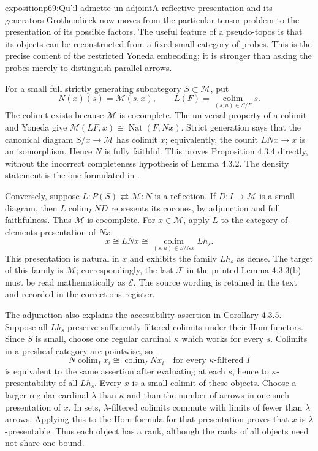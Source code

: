 \begin{dcomment}{exposition}{p69:Qu'il admette un adjoint}{A reflective presentation and its generators}
Grothendieck now moves from the particular tensor problem to the presentation of its possible factors.  The useful feature of a pseudo-topos is that its objects can be reconstructed from a fixed small category of probes.  This is the precise content of the restricted Yoneda embedding; it is stronger than asking the probes merely to distinguish parallel arrows.

For a small full strictly generating subcategory $S\subset\mathcal M$, put
\[
 N(x)(s)=\mathcal M(s,x),\qquad
 L(F)=\operatorname*{colim}_{(s,u)\in S/F}s.
\]
The colimit exists because $\mathcal M$ is cocomplete.  The universal property of a colimit and Yoneda give $\mathcal M(LF,x)\cong\operatorname{Nat}(F,Nx)$.  Strict generation says that the canonical diagram $S/x\to\mathcal M$ has colimit $x$; equivalently, the counit $LNx\to x$ is an isomorphism.  Hence $N$ is fully faithful.  This proves Proposition 4.3.4 directly, without the incorrect completeness hypothesis of Lemma 4.3.2.  The density statement is the one formulated in \citet[Expos\'e I, Proposition 7.2(i)]{SGA4I1972}.

Conversely, suppose $L:P(S)\rightleftarrows\mathcal M:N$ is a reflection.  If $D:I\to\mathcal M$ is a small diagram, then $L\operatorname{colim}_I ND$ represents its cocones, by adjunction and full faithfulness.  Thus $\mathcal M$ is cocomplete.  For $x\in\mathcal M$, apply $L$ to the category-of-elements presentation of $Nx$:
\[
 x\cong LNx
 \cong\operatorname*{colim}_{(s,u)\in S/Nx}Lh_s.
\]
This presentation is natural in $x$ and exhibits the family $Lh_s$ as dense.  The target of this family is $\mathcal M$; correspondingly, the last $\mathcal F$ in the printed Lemma 4.3.3(b) must be read mathematically as $\mathcal E$.  The source wording is retained in the text and recorded in the corrections register.

The adjunction also explains the accessibility assertion in Corollary 4.3.5.  Suppose all $Lh_s$ preserve sufficiently filtered colimits under their Hom functors.  Since $S$ is small, choose one regular cardinal $\kappa$ which works for every $s$.  Colimits in a presheaf category are pointwise, so
\[
 N\operatorname{colim}_I x_i\cong\operatorname{colim}_I Nx_i
 \quad\text{for every $\kappa$-filtered $I$}
\]
is equivalent to the same assertion after evaluating at each $s$, hence to $\kappa$-presentability of all $Lh_s$.  Every $x$ is a small colimit of these objects.  Choose a larger regular cardinal $\lambda$ than $\kappa$ and than the number of arrows in one such presentation of $x$.  In sets, $\lambda$-filtered colimits commute with limits of fewer than $\lambda$ arrows.  Applying this to the Hom formula for that presentation proves that $x$ is $\lambda$-presentable.  Thus each object has a rank, although the ranks of all objects need not share one bound.
\end{dcomment}

